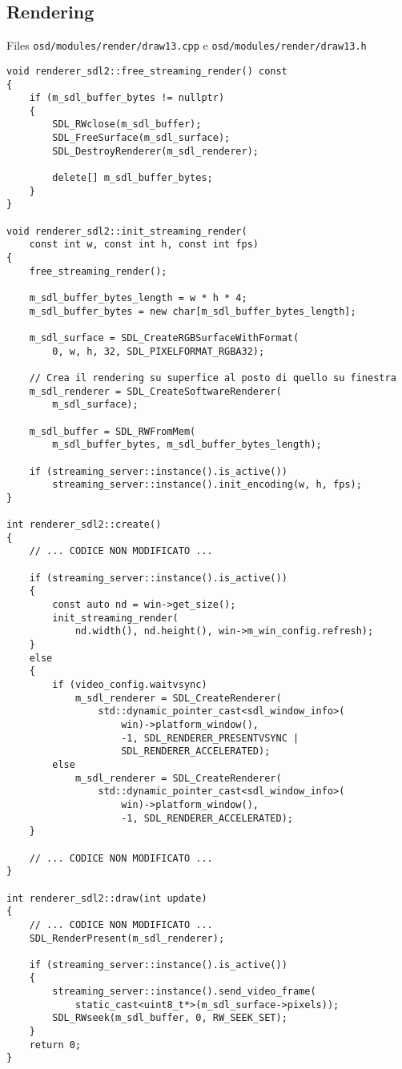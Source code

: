 \subsection{Rendering}
Files \verb|osd/modules/render/draw13.cpp| e \verb|osd/modules/render/draw13.h|

\begin{verbatim}
void renderer_sdl2::free_streaming_render() const
{
	if (m_sdl_buffer_bytes != nullptr)
	{
		SDL_RWclose(m_sdl_buffer);
		SDL_FreeSurface(m_sdl_surface);
		SDL_DestroyRenderer(m_sdl_renderer);

		delete[] m_sdl_buffer_bytes;
	}
}

void renderer_sdl2::init_streaming_render(
	const int w, const int h, const int fps)
{
	free_streaming_render();

	m_sdl_buffer_bytes_length = w * h * 4;
	m_sdl_buffer_bytes = new char[m_sdl_buffer_bytes_length];

	m_sdl_surface = SDL_CreateRGBSurfaceWithFormat(
		0, w, h, 32, SDL_PIXELFORMAT_RGBA32);

	// Crea il rendering su superfice al posto di quello su finestra
	m_sdl_renderer = SDL_CreateSoftwareRenderer(
		m_sdl_surface);

	m_sdl_buffer = SDL_RWFromMem(
		m_sdl_buffer_bytes, m_sdl_buffer_bytes_length);

	if (streaming_server::instance().is_active())
		streaming_server::instance().init_encoding(w, h, fps);
}

int renderer_sdl2::create()
{
	// ... CODICE NON MODIFICATO ...

	if (streaming_server::instance().is_active())
	{
		const auto nd = win->get_size();
		init_streaming_render(
			nd.width(), nd.height(), win->m_win_config.refresh);
	}
	else
	{
		if (video_config.waitvsync)
			m_sdl_renderer = SDL_CreateRenderer(
				std::dynamic_pointer_cast<sdl_window_info>(
					win)->platform_window(), 
					-1, SDL_RENDERER_PRESENTVSYNC | 
					SDL_RENDERER_ACCELERATED);
		else
			m_sdl_renderer = SDL_CreateRenderer(
				std::dynamic_pointer_cast<sdl_window_info>(
					win)->platform_window(), 
					-1, SDL_RENDERER_ACCELERATED);
	}

	// ... CODICE NON MODIFICATO ...
}

int renderer_sdl2::draw(int update)
{
	// ... CODICE NON MODIFICATO ...
	SDL_RenderPresent(m_sdl_renderer);	

	if (streaming_server::instance().is_active())
	{
		streaming_server::instance().send_video_frame(
			static_cast<uint8_t*>(m_sdl_surface->pixels));
		SDL_RWseek(m_sdl_buffer, 0, RW_SEEK_SET);
	}
	return 0;
}
\end{verbatim}




